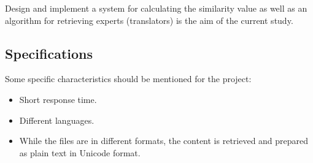 Design and implement a system for calculating the similarity value as well as an algorithm for retrieving experts (translators) is the aim of the current study.

\subsection{Specifications}
Some specific characteristics should be mentioned for the project:

\begin{itemize}
\item Short response time.
\item Different languages.
\item While the files are in different formats, the content is retrieved and prepared as plain text in Unicode format.
\end{itemize}